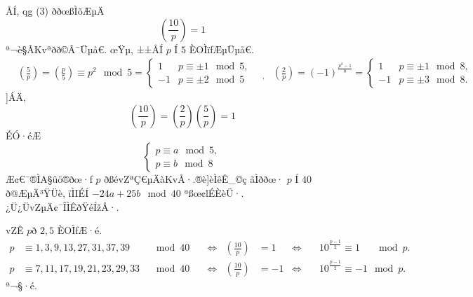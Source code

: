 \documentclass{jsarticle}
\theoremstyle{definition}
\begin{document}
ÅÍ, qg (3) ðð­œßÌõÆµÄ
\[
 \left(\frac{10}{p}\right)=1
\]
ª¬è§ÂKv\ªðð©Â¯Üµå€.
œŸµ, ±±ÅÍ $p$ Í $5$ ÈOÌïfÆµÜµå€.
\begin{align*}
& \left(\frac{5}{p}\right)= \left(\frac{p}{5}\right)\equiv p^2 \!\mod 5
 =
 \begin{cases}
1  & p\equiv \pm 1\mod 5,
\\
-1 & p\equiv \pm 2\mod 5
 \end{cases}
\quad_,
&\left(\frac{2}{p}\right)=(-1)^{\frac{p^2-1}{8}}
=
\begin{cases}
1  & p\equiv \pm 1\mod 8,
\\
-1 & p\equiv \pm 3\mod 8.
\end{cases}
\end{align*}
]ÁÄ,
\[
\left(\frac{10}{p}\right)= \left(\frac{2}{p}\right) \left(\frac{5}{p}\right)=1
\]
ÉÓ·éÆ
\[
\begin{cases}
p\equiv a \mod 5,
\\
p\equiv b \mod 8
\end{cases}
\]
Æ¢€¯®ÌA§ûö®ðœ·f $p$ ðßévZªÇ€µÄàKvÅ·.®è]èÌêÊ_©ç
ãÌððœ· $p$ Í $40$ ð@ÆµÄ³ŸÜè,
ïÌIÉÍ $-24a+25b \mod 40$ ªßœ¢lÉÈèÜ·.
¿Ü¿ÜvZµÄ¢¯ÎÌÊðŸéÍžÅ·.
\begin{itembox}[|]{vZÊ}
$p$ð $2,5$ ÈOÌfÆ·é.
\begin{align*}
p&\equiv 1,3,9,13,27,31,37,39\,&\mod 40 &\quad\Leftrightarrow &\left ( \frac{10}{p} \right )&=1&\Leftrightarrow  &
\quad 10^{\frac{p-1}{2}}\equiv 1 \phantom{-}\mod p.
\\
p&\equiv 7,11,17,19,21,23,29,33\,&\mod 40&\quad\Leftrightarrow &\left ( \frac{10}{p} \right )&=-1&\Leftrightarrow  &
\quad 10^{\frac{p-1}{2}}\equiv -1 \mod p.
\end{align*}
ª¬§·é.
\end{itembox}
\end{document}
